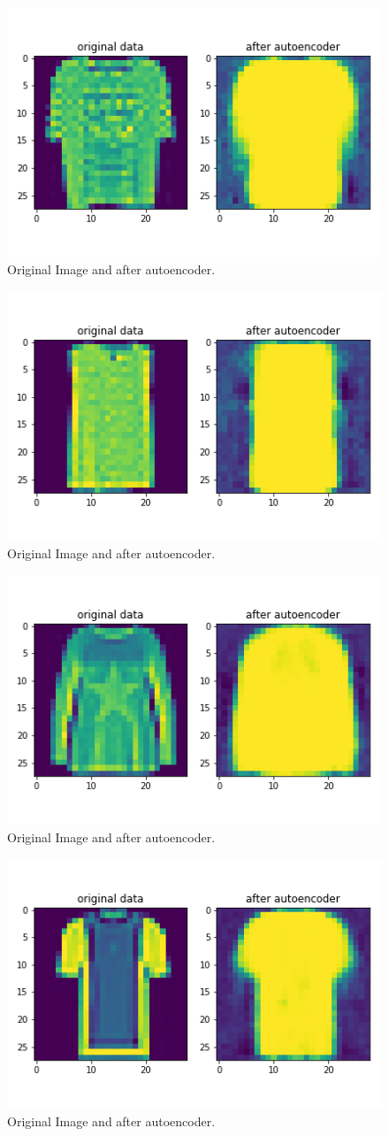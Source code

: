 \documentclass[11pt,a4paper,oneside]{article}
\begin{document}
\begin{figure}[!btp]
	\centering
	\includegraphics[width=.6\textwidth]{figures/save_ev_5}
	\caption{Original Image and after autoencoder.}
\end{figure}
\begin{figure}[!btp]
	\centering
	\includegraphics[width=.6\textwidth]{figures/save_ev_6}
	\caption{Original Image and after autoencoder.}
\end{figure}
\begin{figure}[!btp]
	\centering
	\includegraphics[width=.6\textwidth]{figures/save_ev_7}
	\caption{Original Image and after autoencoder.}
\end{figure}
\begin{figure}[!btp]
	\centering
	\includegraphics[width=.6\textwidth]{figures/save_ev_8}
	\caption{Original Image and after autoencoder.}
\end{figure}
\end{document}
